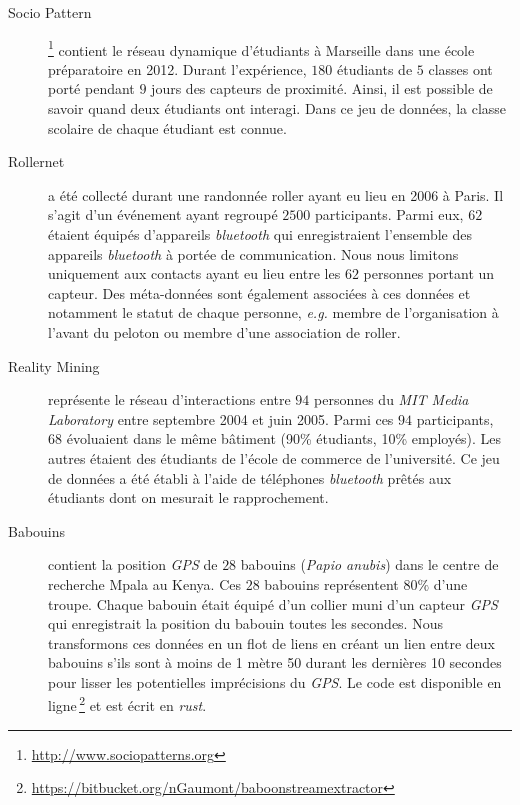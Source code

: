 \begin{description}
\item[Socio Pattern~\cite{Fournet2014}]\footnote{\url{http://www.sociopatterns.org}} contient le réseau dynamique d'étudiants à Marseille dans une école préparatoire en 2012. Durant l'expérience, $180$ étudiants de $5$ classes ont porté pendant $9$ jours des capteurs de proximité.
Ainsi, il est possible de savoir quand deux étudiants ont interagi. 
Dans ce jeu de données, la classe scolaire de chaque étudiant est connue.\\

\item[Rollernet~\cite{Tournoux2009}] a été collecté durant une randonnée roller ayant eu lieu en 2006 à Paris.
Il s'agit d'un événement ayant regroupé $2500$ participants.
Parmi eux, $62$ étaient équipés d'appareils \emph{bluetooth} qui enregistraient l'ensemble des appareils \emph{bluetooth} à portée de communication.
Nous nous limitons uniquement aux contacts ayant eu lieu entre les $62$ personnes portant un capteur.
Des méta-données sont également associées à ces données et notamment le statut de chaque personne, \emph{e.g.} membre de l'organisation à l'avant du peloton ou membre d'une association de roller.\\

\item[Reality Mining~\cite{Eagle2009}] représente le réseau d'interactions entre $94$ personnes du \emph{MIT Media Laboratory} entre septembre 2004 et juin 2005.
Parmi ces $94$ participants, $68$ évoluaient dans le même bâtiment (90\% étudiants, 10\% employés).
Les autres étaient des étudiants de l'école de commerce de l'université.
Ce jeu de données a été établi à l'aide de téléphones \emph{bluetooth} prêtés aux étudiants dont on mesurait le rapprochement.\\

\item[Babouins~\cite{Crofoot2015,Strandburg-Peshkin2015}] contient la position \emph{GPS} de $28$ babouins (\emph{Papio anubis}) dans le centre de recherche Mpala au Kenya.
Ces $28$ babouins représentent $80\%$ d'une troupe.
Chaque babouin était équipé d'un collier muni d'un capteur \emph{GPS} qui enregistrait la position du babouin toutes les secondes.
Nous transformons ces données en un flot de liens en créant un lien entre deux babouins s'ils sont à moins de 1 mètre 50 durant les dernières 10 secondes pour lisser les potentielles imprécisions du \emph{GPS}.
Le code est disponible en ligne\,\footnote{\url{https://bitbucket.org/nGaumont/baboonstreamextractor}} et est écrit en \emph{rust}.
\end{description}

